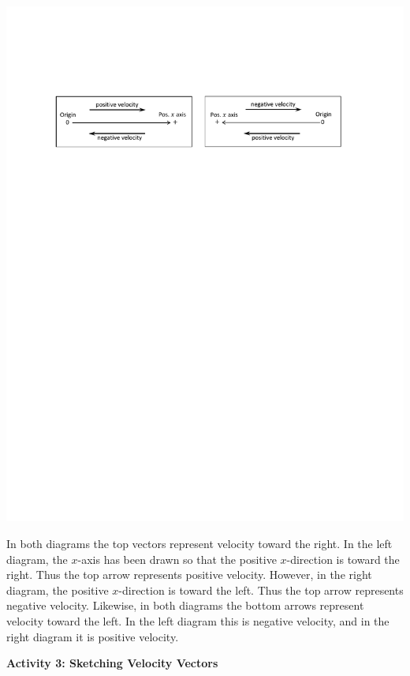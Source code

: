 \vspace{0.3cm}
{\par\centering \includegraphics{velocity/velocity_signs.pdf} \par}
\vspace{0.3cm}

In both diagrams the top vectors represent velocity toward the right. In the
left diagram, the $x$-axis has been drawn so that the positive $x$-direction is
toward the right. Thus the top arrow represents positive velocity. However,
in the right diagram, the positive $x$-direction is toward the left. Thus the
top arrow represents negative velocity. Likewise, in both diagrams the bottom
arrows represent velocity toward the left. In the left diagram this is negative
velocity, and in the right diagram it is positive velocity.

\textbf{Activity 3: Sketching Velocity Vectors} 

